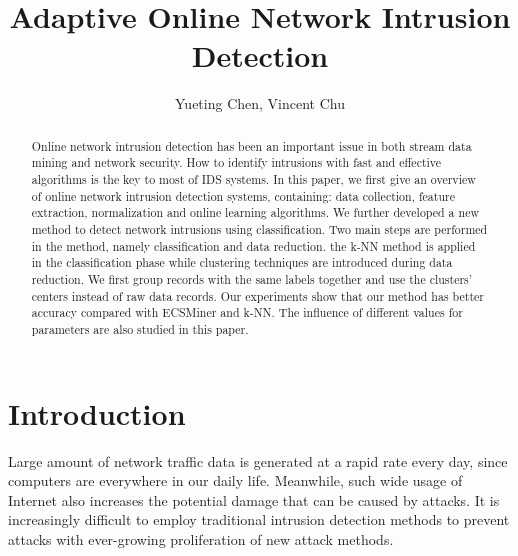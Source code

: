 \documentclass[runningheads]{llncs}
\begin{document}
	
	\title{Adaptive Online Network Intrusion Detection}
	
	\author{Yueting Chen, Vincent Chu}
	
	
	\maketitle
	
	{\tiny }
	\begin{abstract} \label{abstract}
	
		Online network intrusion detection has been an important issue in both stream data mining and network security. How to identify intrusions with fast and effective algorithms is the key to most of IDS systems. In this paper, we first give an overview of online network intrusion detection systems, containing: data collection, feature extraction, normalization and online learning algorithms. We further developed a new method to detect network intrusions using classification. Two main steps are performed in the method, namely classification and data reduction. the k-NN method is applied in the classification phase while clustering techniques are introduced during data reduction. We first group records with the same labels together and use the clusters' centers instead of raw data records. Our experiments show that our method has better accuracy compared with ECSMiner and k-NN. The influence of different values for parameters are also studied in this paper. 
		
	\end{abstract}
	
	\section{Introduction} \label{introduction}
	
	Large amount of network traffic data is generated at a rapid rate every day, since computers are everywhere in our daily life. Meanwhile, such wide usage of Internet also increases the potential damage that can be caused by attacks. It is increasingly difficult to employ traditional intrusion detection methods to prevent attacks with ever-growing proliferation of new attack methods.
	
\end{document}
